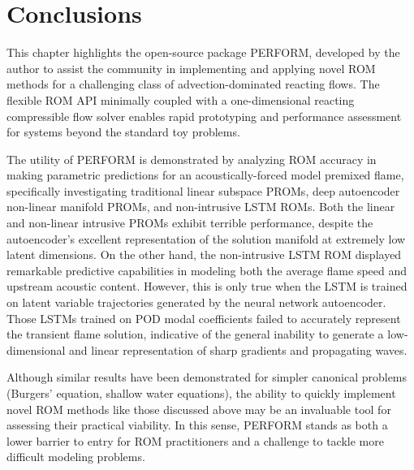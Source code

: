 \section{Conclusions}

This chapter highlights the open-source package PERFORM, developed by the author to assist the community in implementing and applying novel ROM methods for a challenging class of advection-dominated reacting flows. The flexible ROM API minimally coupled with a one-dimensional reacting compressible flow solver enables rapid prototyping and performance assessment for systems beyond the standard toy problems. 

The utility of PERFORM is demonstrated by analyzing ROM accuracy in making parametric predictions for an acoustically-forced model premixed flame, specifically investigating traditional linear subspace PROMs, deep autoencoder non-linear manifold PROMs, and non-intrusive LSTM ROMs. Both the linear and non-linear intrusive PROMs exhibit terrible performance, despite the autoencoder's excellent representation of the solution manifold at extremely low latent dimensions. On the other hand, the non-intrusive LSTM ROM displayed remarkable predictive capabilities in modeling both the average flame speed and upstream acoustic content. However, this is only true when the LSTM is trained on latent variable trajectories generated by the neural network autoencoder. Those LSTMs trained on POD modal coefficients failed to accurately represent the transient flame solution, indicative of the general inability to generate a low-dimensional and linear representation of sharp gradients and propagating waves.

Although similar results have been demonstrated for simpler canonical problems (Burgers' equation, shallow water equations), the ability to quickly implement novel ROM methods like those discussed above may be an invaluable tool for assessing their practical viability. In this sense, PERFORM stands as both a lower barrier to entry for ROM practitioners and a challenge to tackle more difficult modeling problems.